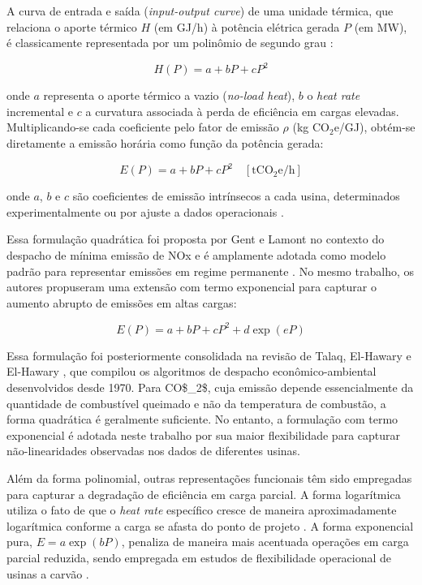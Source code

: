 A curva de entrada e saída (\textit{input-output curve}) de uma unidade térmica, que relaciona o aporte térmico \(H\) (em GJ/h) à potência elétrica gerada \(P\) (em MW), é classicamente representada por um polinômio de segundo grau \cite{wood2013power}:

\begin{equation}
H(P) = a + bP + cP^2
\label{eq:input_output}
\end{equation}

onde \(a\) representa o aporte térmico a vazio (\textit{no-load heat}), \(b\) o \textit{heat rate} incremental e \(c\) a curvatura associada à perda de eficiência em cargas elevadas. Multiplicando-se cada coeficiente pelo fator de emissão \(\rho\) (kg CO\(_2\)e/GJ), obtém-se diretamente a emissão horária como função da potência gerada:

\begin{equation}
E(P) = a + bP + cP^2 \quad [\text{tCO}_2\text{e}/\text{h}]
\label{eq:emissao_quadratica}
\end{equation}

onde \(a\), \(b\) e \(c\) são coeficientes de emissão intrínsecos a cada usina, determinados experimentalmente ou por ajuste a dados operacionais \cite{gent1971minimum, wood2013power}.

Essa formulação quadrática foi proposta por Gent e Lamont \cite{gent1971minimum} no contexto do despacho de mínima emissão de NOx e é amplamente adotada como modelo padrão para representar emissões em regime permanente \cite{kothari2011power}. No mesmo trabalho, os autores propuseram uma extensão com termo exponencial para capturar o aumento abrupto de emissões em altas cargas:

\begin{equation}
E(P) = a + bP + cP^2 + d \exp(eP)
\label{eq:emissao_exponencial}
\end{equation}

Essa formulação foi posteriormente consolidada na revisão de Talaq, El-Hawary e El-Hawary \cite{talaq1994summary}, que compilou os algoritmos de despacho econômico-ambiental desenvolvidos desde 1970. Para \ac{CO$_2$}, cuja emissão depende essencialmente da quantidade de combustível queimado e não da temperatura de combustão, a forma quadrática é geralmente suficiente. No entanto, a formulação com termo exponencial é adotada neste trabalho por sua maior flexibilidade para capturar não-linearidades observadas nos dados de diferentes usinas.

Além da forma polinomial, outras representações funcionais têm sido empregadas para capturar a degradação de eficiência em carga parcial. A forma logarítmica utiliza o fato de que o \textit{heat rate} específico cresce de maneira aproximadamente logarítmica conforme a carga se afasta do ponto de projeto \cite{eia2015}. A forma exponencial pura, \(E = a \exp(bP)\), penaliza de maneira mais acentuada operações em carga parcial reduzida, sendo empregada em estudos de flexibilidade operacional de usinas a carvão \cite{henderson2014}.

